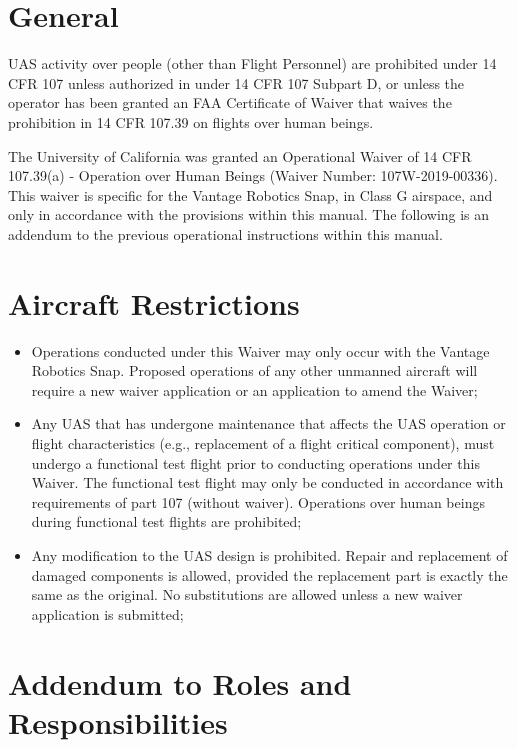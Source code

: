 \documentclass[
]{book}
\providecommand{\tightlist}{%
  \setlength{\itemsep}{0pt}\setlength{\parskip}{0pt}}
\begin{document}
\section{General}\label{s39v-gen}

UAS activity over people (other than Flight Personnel) are prohibited under 14 CFR 107 unless authorized in under 14 CFR 107 Subpart D, or unless the operator has been granted an FAA Certificate of Waiver that waives the prohibition in 14 CFR 107.39 on flights over human beings.

The University of California was granted an Operational Waiver of 14 CFR 107.39(a) - Operation over Human Beings (Waiver Number: 107W-2019-00336). This waiver is specific for the Vantage Robotics Snap, in Class G airspace, and only in accordance with the provisions within this manual. The following is an addendum to the previous operational instructions within this manual.

\section{Aircraft Restrictions}\label{s39v-ar}

\begin{itemize}
\tightlist
\item
  Operations conducted under this Waiver may only occur with the Vantage Robotics Snap. Proposed operations of any other unmanned aircraft will require a new waiver application or an application to amend the Waiver;
\item
  Any UAS that has undergone maintenance that affects the UAS operation or flight characteristics (e.g., replacement of a flight critical component), must undergo a functional test flight prior to conducting operations under this Waiver. The functional test flight may only be conducted in accordance with requirements of part 107 (without waiver). Operations over human beings during functional test flights are prohibited;
\item
  Any modification to the UAS design is prohibited. Repair and replacement of damaged components is allowed, provided the replacement part is exactly the same as the original. No substitutions are allowed unless a new waiver application is submitted;
\end{itemize}

\section{Addendum to Roles and Responsibilities}\label{s39v-rr}
\end{document}
